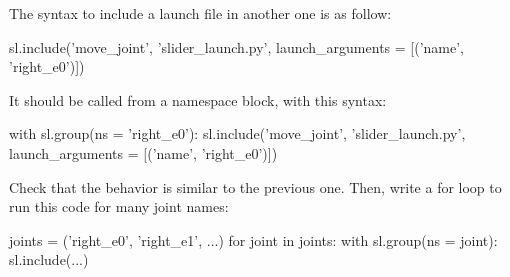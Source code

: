 \documentclass{ecnreport}
\begin{document}
The syntax to include a launch file in another one is as follow:
\begin{pythoncodelarge}
sl.include('move_joint', 'slider_launch.py', launch_arguments = [('name', 'right_e0')])
\end{pythoncodelarge}

It should be called from a namespace block, with this syntax:
\begin{pythoncodelarge}
with sl.group(ns = 'right_e0'):
  sl.include('move_joint', 'slider_launch.py', launch_arguments = [('name', 'right_e0')])
\end{pythoncodelarge}

Check that the behavior is similar to the previous one. Then, write a for loop to run this code for many joint names:
\begin{pythoncodelarge}
joints = ('right_e0', 'right_e1', ...)
for joint in joints:
    with sl.group(ns = joint):
        sl.include(...)
\end{pythoncodelarge}
\end{document}

